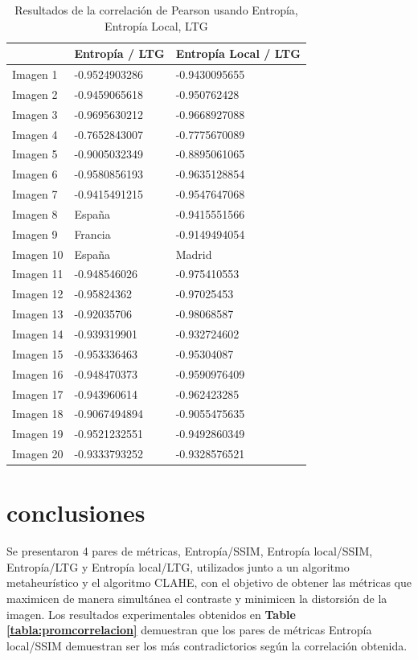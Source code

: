 \documentclass[spanish,twocolumn]{article}
\begin{document}
{\begin{table}[htbp]
\begin{center}
\begin{tabular}{|l|l|l|}
\hline
& Entropía / LTG & Entropía Local / LTG\\
\hline \hline
Imagen 1 & -0.9524903286 & -0.9430095655 \\ \hline
Imagen 2 & -0.9459065618 & -0.950762428 \\ \hline
Imagen 3 & -0.9695630212 & -0.9668927088 \\ \hline
Imagen 4 & -0.7652843007 & -0.7775670089 \\ \hline
Imagen 5 & -0.9005032349 & -0.8895061065 \\ \hline
Imagen 6 & -0.9580856193 & -0.9635128854 \\ \hline
Imagen 7 & -0.9415491215 & -0.9547647068 \\ \hline
Imagen 8 & España & -0.9415551566 \\ \hline
Imagen 9 & Francia & -0.9149494054 \\ \hline
Imagen 10 & España & Madrid \\ \hline
Imagen 11 & -0.948546026 & -0.975410553\\ \hline
Imagen 12 & -0.95824362 & -0.97025453 \\ \hline
Imagen 13 & -0.92035706 & -0.98068587 \\ \hline
Imagen 14 & -0.939319901 & -0.932724602 \\ \hline
Imagen 15 & -0.953336463 & -0.95304087  \\ \hline
Imagen 16 & -0.948470373 & -0.9590976409 \\ \hline
Imagen 17 & -0.943960614 & -0.962423285 \\ \hline
Imagen 18 & -0.9067494894 & -0.9055475635 \\ \hline
Imagen 19 & -0.9521232551 & -0.9492860349 \\ \hline
Imagen 20 & -0.9333793252 & -0.9328576521 \\ \hline
\end{tabular}
\caption{Resultados de la correlación de Pearson usando Entropía, Entropía Local, LTG}
\label{tabla:correlacionLTG}
\end{center}
\end{table}

\section{conclusiones}
\label{sec:conclusion}
Se presentaron 4 pares de métricas, Entropía/SSIM, Entropía local/SSIM, Entropía/LTG y Entropía local/LTG, utilizados junto a un algoritmo metaheurístico y el algoritmo CLAHE, con el objetivo de obtener las métricas que maximicen de manera simultánea el contraste y minimicen la distorsión de la imagen. Los resultados experimentales obtenidos en \textbf{Table \ref{tabla:promcorrelacion}} demuestran que los pares de métricas Entropía local/SSIM demuestran ser los más contradictorios según la correlación obtenida.

}
\end{document}
